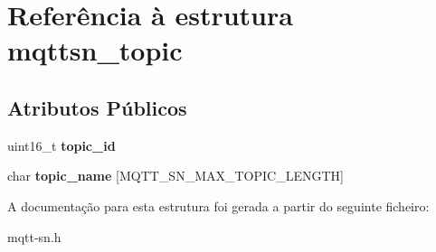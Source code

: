 \hypertarget{structmqttsn__topic}{\section{Referência à estrutura mqttsn\+\_\+topic}
\label{structmqttsn__topic}
}
\subsection*{Atributos Públicos}
\begin{DoxyCompactItemize}
\item 
\hypertarget{structmqttsn__topic_a204604457fb4ae4797a9832616bf6cda}{uint16\+\_\+t {\bfseries topic\+\_\+id}}\label{structmqttsn__topic_a204604457fb4ae4797a9832616bf6cda}

\item 
\hypertarget{structmqttsn__topic_a316ec55508709e6d7dd49422de478cd6}{char {\bfseries topic\+\_\+name} \mbox{[}M\+Q\+T\+T\+\_\+\+S\+N\+\_\+\+M\+A\+X\+\_\+\+T\+O\+P\+I\+C\+\_\+\+L\+E\+N\+G\+T\+H\mbox{]}}\label{structmqttsn__topic_a316ec55508709e6d7dd49422de478cd6}

\end{DoxyCompactItemize}


A documentação para esta estrutura foi gerada a partir do seguinte ficheiro\+:\begin{DoxyCompactItemize}
\item 
mqtt-\/sn.\+h\end{DoxyCompactItemize}

